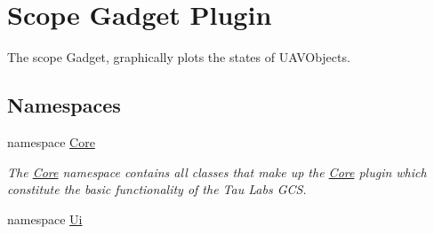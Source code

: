\hypertarget{group___scope_plugin}{\section{Scope Gadget Plugin}
\label{group___scope_plugin}
}


The scope Gadget, graphically plots the states of U\-A\-V\-Objects.  


\subsection*{Namespaces}
\begin{DoxyCompactItemize}
\item 
namespace \hyperlink{namespace_core}{Core}
\begin{DoxyCompactList}\small\item\em The \hyperlink{namespace_core}{Core} namespace contains all classes that make up the \hyperlink{namespace_core}{Core} plugin which constitute the basic functionality of the Tau Labs G\-C\-S. \end{DoxyCompactList}\item 
namespace \hyperlink{namespace_ui}{Ui}
\end{DoxyCompactItemize}
